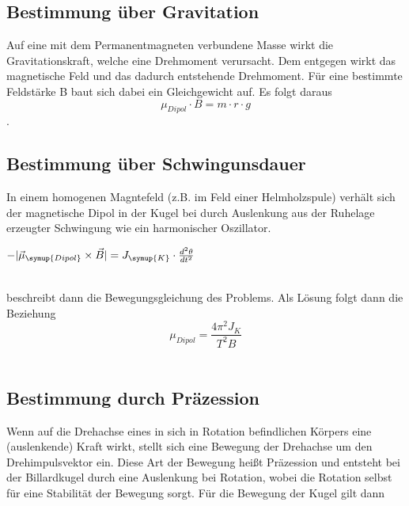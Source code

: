 \subsection{Bestimmung über Gravitation}
Auf eine mit dem Permanentmagneten verbundene Masse wirkt die Gravitationskraft, welche eine Drehmoment verursacht. Dem entgegen wirkt das magnetische Feld und das
dadurch entstehende Drehmoment. Für eine bestimmte Feldstärke B baut sich dabei ein Gleichgewicht auf. Es folgt daraus
\begin{equation}
    \mu_{Dipol} \cdot B = m \cdot r \cdot g 
    \label{eqn:grav2} 
\end{equation}.

\subsection{Bestimmung über Schwingunsdauer}
In einem homogenen Magntefeld (z.B. im Feld einer Helmholzspule) verhält sich der magnetische Dipol in der Kugel bei durch Auslenkung aus der Ruhelage erzeugter Schwingung
wie ein harmonischer Oszillator. \\

\begin{centering}

$-\lvert{\vec{\mu}_{\symup{Dipol}} \times \vec{B}}\rvert = J_{\symup{K}} \cdot \frac{d^2 \theta}{dt^2}$

\end{centering}
\\
beschreibt dann die Bewegungsgleichung des Problems. Als Lösung folgt dann die Beziehung\\

\begin{equation}
    \mu_{Dipol}=\frac{4\pi^2 J_{K}}{T^2 B}
    \label{eqn:schwingung1}
\end{equation}
\\


\subsection{Bestimmung durch Präzession}
Wenn auf die Drehachse eines in sich in Rotation befindlichen Körpers eine (auslenkende) Kraft wirkt, stellt sich eine Bewegung der Drehachse um den Drehimpulsvektor ein. 
Diese Art der Bewegung heißt Präzession und entsteht bei der Billardkugel durch eine Auslenkung bei Rotation, wobei die Rotation selbst für eine Stabilität der Bewegung sorgt.
Für die Bewegung der Kugel gilt dann\\

